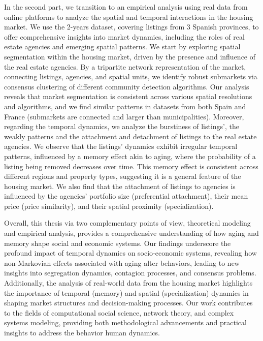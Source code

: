 In the second part, we transition to an empirical analysis using real data from online platforms to analyze the spatial and temporal interactions in the housing market. We use the 2-years dataset, covering listings from 3 Spanish provinces, to offer comprehensive insights into market dynamics, including the roles of real estate agencies and emerging spatial patterns. We start by exploring spatial segmentation within the housing market, driven by the presence and influence of the real estate agencies. By a tripartite network representation of the market, connecting listings, agencies, and spatial units, we identify robust submarkets via consensus clustering of different community detection algorithms. Our analysis reveals that market segmentation is consistent across various spatial resolutions and algorithms, and we find similar patterns in datasets from both Spain and France (submarkets are connected and larger than municipalities). Moreover, regarding the temporal dynamics, we analyze the burstiness of listings', the weakly patterns and the attachment and detachment of listings to the real estate agencies. We observe that the listings' dynamics exhibit irregular temporal patterns, influenced by a memory effect akin to aging, where the probability of a listing being removed decreases over time. This memory effect is consistent across different regions and property types, suggesting it is a general feature of the housing market. We also find that the attachment of listings to agencies is influenced by the agencies' portfolio size (preferential attachment), their mean price (price similarity), and their spatial proximity (specialization).

Overall, this thesis via two complementary points of view, theoretical modeling and empirical analysis, provides a comprehensive understanding of how aging and memory shape social and economic systems. Our findings underscore the profound impact of temporal dynamics on socio-economic systems, revealing how non-Markovian effects associated with aging alter behaviors, leading to new insights into segregation dynamics, contagion processes, and consensus problems. Additionally, the analysis of real-world data from the housing market highlights the importance of temporal (memory) and spatial (specialization) dynamics in shaping market structures and decision-making processes. Our work contributes to the fields of computational social science, network theory, and complex systems modeling, providing both methodological advancements and practical insights to address the behavior human dynamics.


\vfill